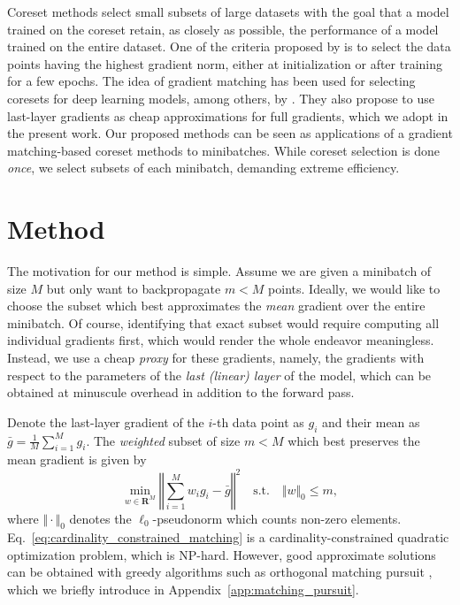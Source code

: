 \documentclass{article}
\newcommand{\R}{\mathbf{R}}
\theoremstyle{plain}
\theoremstyle{definition}
\theoremstyle{remark}
\begin{document}
Coreset methods select small subsets of large datasets with the goal that a model trained on the coreset retain, as closely as possible, the performance of a model trained on the entire dataset.
One of the criteria proposed by \citet{paul2021deep} is to select the data points having the highest gradient norm, either at initialization or after training for a few epochs.
The idea of gradient matching has been used for selecting coresets for deep learning models, among others, by \citet{killamsetty2021grad}. %
They also propose to use last-layer gradients as cheap approximations for full gradients, which we adopt in the present work.
Our proposed methods can be seen as applications of a gradient matching-based coreset methods to minibatches.
While coreset selection is done \emph{once}, we select subsets of each minibatch, demanding extreme efficiency.






\section{Method}

\label{sec:method}



The motivation for our method is simple.
Assume we are given a minibatch of size $M$ but only want to backpropagate $m<M$ points.
Ideally, we would like to choose the subset which best approximates the \emph{mean} gradient over the entire minibatch.
Of course, identifying that exact subset would require computing all individual gradients first, which would render the whole endeavor meaningless.
Instead, we use a cheap \emph{proxy} for these gradients, namely, the gradients with respect to the parameters of the \emph{last (linear) layer} of the model, which can be obtained at minuscule overhead in addition to the forward pass.

Denote the last-layer gradient of the $i$-th data point as $g_i$ and their mean as $\bar{g} = \tfrac{1}{M} \sum_{i=1}^M g_i$.
The \emph{weighted} subset of size $m< M$ which best preserves the mean gradient is given by
\begin{equation}
    \label{eq:cardinality_constrained_matching}
    \min_{w \in \R^M} \left\Vert \sum_{i=1}^M w_i g_i - \bar{g}\right\Vert^2 \quad \text{s.t.} \quad \Vert w \Vert_0 \leq m,
\end{equation}
where $\Vert\cdot\Vert_0$ denotes the $\ell_0$-pseudonorm which counts non-zero elements.
Eq.~\eqref{eq:cardinality_constrained_matching} is a cardinality-constrained quadratic optimization problem, which is NP-hard.
However, good approximate solutions can be obtained with greedy algorithms such as orthogonal matching pursuit \citep[OMP;][]{mallat1993matching}, which we briefly introduce in Appendix~\ref{app:matching_pursuit}.
\end{document}

